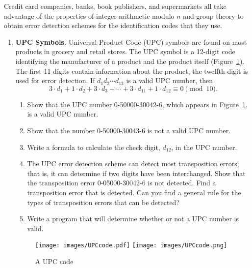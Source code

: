 \documentclass[12pt,reqno]{amsart}
\begin{document}
 
{\small
Credit card companies, banks, book publishers, and supermarkets all
take advantage of the properties of integer arithmetic modulo $n$ and
group theory to obtain error detection schemes for the identification
codes that they use. 
\begin{enumerate}
 



\item
\textbf{UPC Symbols.}
Universal Product
Code (UPC) symbols are found on most
products in grocery and retail stores. The UPC symbol is a 12-digit
code identifying the manufacturer of a product and the product itself
(Figure~\ref{groups_figure_3}). The first 11 digits contain information about the
product; the twelfth digit is used for error detection. If $d_1 d_2
\cdots d_{12}$ is a valid UPC number, then  
\[
3 \cdot d_1 + 1 \cdot d_2 + 3 \cdot d_3 + \cdots + 3 \cdot
d_{11} + 1 \cdot d_{12} \equiv 0 \pmod{10}.
\]
\begin{enumerate}
 
\item
Show that the UPC number  0-50000-30042-6, which appears in
Figure~\ref{groups_figure_3}, is a valid UPC number. 
 
\item
Show that the number 0-50000-30043-6 is not a valid UPC number.
 
\item
Write a  formula to calculate the check digit, $d_{12}$, in the UPC number. 
 
\item
The  UPC error detection scheme can detect most transposition errors; that is, it can determine if two digits have been interchanged.  Show that the transposition error 0-05000-30042-6 is not detected.  Find a transposition error that is detected.  Can you find a general rule for the types of transposition errors that can be detected?
 
\item
Write a program that will determine whether or not a UPC number is valid. 
 
\end{enumerate}
 
\begin{figure}
\begin{center}
\centerline {
{\texttt{[image: images/UPCcode.pdf]}}{}
{\texttt{[image: images/UPCcode.png]}}
}
\end{center}
\caption{A UPC code}
\label{groups_figure_3}
\end{figure}


\end{enumerate}}
\end{document}
